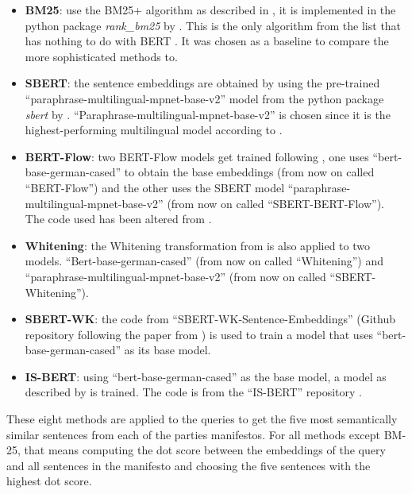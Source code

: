 \begin{itemize}
    \item \textbf{BM25}: use the BM25+ algorithm as described in \citet{lv2011lower}, it is implemented in the python package \textit{rank\_bm25} by \citet{rank_bm25}. This is the only algorithm from the list that has nothing to do with BERT \citep{devlin2018bert}. It was chosen as a baseline to compare the more sophisticated methods to.
    \item \textbf{SBERT}: the sentence embeddings are obtained by using the pre-trained ``paraphrase-multilingual-mpnet-base-v2'' model \citep{reimers-2020-multilingual-sentence-bert} from the python package \textit{sbert} by \citet{reimers2019sbert}. ``Paraphrase-multilingual-mpnet-base-v2'' is chosen since it is the highest-performing multilingual model according to \citet{reimers_2022}.
    \item \textbf{BERT-Flow}: two BERT-Flow models get trained following \citet{li2020bertflow}, one uses ``bert-base-german-cased'' \citep{german_bert} to obtain the base embeddings (from now on called ``BERT-Flow'') and the other uses the SBERT model ``paraphrase-multilingual-mpnet-base-v2'' \citep{reimers-2020-multilingual-sentence-bert} (from now on called ``SBERT-BERT-Flow''). The code used has been altered from \citet{pytorch-bertflow}.
    \item \textbf{Whitening}: the Whitening transformation from \citet{huang2021whiteningbert} is also applied to two models. ``Bert-base-german-cased'' \citep{german_bert} (from now on called ``Whitening'') and ``paraphrase-multilingual-mpnet-base-v2'' \citep{reimers-2020-multilingual-sentence-bert} (from now on called ``SBERT-Whitening'').
    \item \textbf{SBERT-WK}: the code from ``SBERT-WK-Sentence-Embeddings'' \citep{sbert-wk} (Github repository following the paper from \citet{wang2020sbertwk}) is used to train a model that uses ``bert-base-german-cased'' \citep{german_bert} as its base model.
    \item \textbf{IS-BERT}: using ``bert-base-german-cased'' \citep{german_bert} as the base model, a model as described by \citet{zhang2020isbert} is trained. The code is from the ``IS-BERT'' repository \citep{isbert}.
\end{itemize}

These eight methods are applied to the queries to get the five most semantically similar sentences from each of the parties manifestos. For all methods except BM-25, that means computing the dot score between the embeddings of the query and all sentences in the manifesto and choosing the five sentences with the highest dot score.


